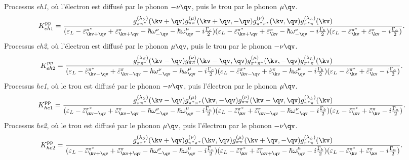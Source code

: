 Processus \textit{eh1}, où l'électron est diffusé par le phonon $-\nu\qv$, puis le trou par le phonon $\mu\qv$.
\begin{equation}
        K_{eh1}^{\text{pp}} = \frac{g^{(\lambda_S)}_{\pi\pi^*}(\kv+\qv)g^{(\mu)}_{\pi\pi}(\kv+\qv,-\qv)g_{\pi^*\pi^*}^{(\nu)}(\kv,\qv)g_{\pi^*\pi}^{(\lambda_L)}(\kv)}{(\varepsilon_L-\tilde{\varepsilon}_{\kv+\qv}^{\pi^*}+\tilde{\varepsilon}_{\kv+\qv}^\pi-\hbar\omega_{-\qv}^\nu-\hbar\omega_\qv^\mu-i\frac{\Gamma_c}{2})(\varepsilon_L-\tilde{\varepsilon}_{\kv+\qv}^{\pi^*}+\tilde{\varepsilon}_{\kv}^\pi-\hbar\omega_{-\qv}^\nu-i\frac{\Gamma_b}{2})(\varepsilon_L-\tilde{\varepsilon}_\kv^{\pi^*}+\tilde{\varepsilon}_{\kv}^\pi-i\frac{\Gamma_a}{2})}\label{eqn:pp_eh1}.
\end{equation}
Processus \textit{eh2}, où l'électron est diffusé par le phonon $\mu\qv$, puis le trou par le phonon $-\nu\qv$.
\begin{equation}
        K_{eh2}^{\text{pp}} = \frac{g^{(\lambda_S)}_{\pi\pi^*}(\kv-\qv)g^{(\nu)}_{\pi\pi}(\kv-\qv,\qv)g_{\pi^*\pi^*}^{(\mu)}(\kv,-\qv)g_{\pi^*\pi}^{(\lambda_L)}(\kv)}{(\varepsilon_L-\tilde{\varepsilon}_{\kv-\qv}^{\pi^*}+\tilde{\varepsilon}_{\kv-\qv}^\pi-\hbar\omega_{-\qv}^\nu-\hbar\omega_\qv^\mu-i\frac{\Gamma_c}{2})(\varepsilon_L-\tilde{\varepsilon}_{\kv-\qv}^{\pi^*}+\tilde{\varepsilon}_{\kv}^\pi-\hbar\omega_{\qv}^\mu-i\frac{\Gamma_b}{2})(\varepsilon_L-\tilde{\varepsilon}_\kv^{\pi^*}+\tilde{\varepsilon}_{\kv}^\pi-i\frac{\Gamma_a}{2})}\label{eqn:pp_eh2}.
\end{equation}
Processus \textit{he1}, où le trou est diffusé par le phonon $-\nu\qv$, puis l'électron par le phonon $\mu\qv$.
\begin{equation}
        K_{he1}^{\text{pp}} = \frac{g^{(\lambda_S)}_{\pi\pi^*}(\kv-\qv)g^{(\mu)}_{\pi^*\pi^*}(\kv,-\qv)g_{\pi\pi}^{(\nu)}(\kv-\qv,\qv)g_{\pi^*\pi}^{(\lambda_L)}(\kv)}{(\varepsilon_L-\tilde{\varepsilon}_{\kv-\qv}^{\pi^*}+\tilde{\varepsilon}_{\kv-\qv}^\pi-\hbar\omega_{-\qv}^\nu-\hbar\omega_\qv^\mu-i\frac{\Gamma_c}{2})(\varepsilon_L-\tilde{\varepsilon}_{\kv}^{\pi^*}+\tilde{\varepsilon}_{\kv-\qv}^\pi-\hbar\omega_{-\qv}^\nu-i\frac{\Gamma_b}{2})(\varepsilon_L-\tilde{\varepsilon}_\kv^{\pi^*}+\tilde{\varepsilon}_{\kv}^\pi-i\frac{\Gamma_a}{2})}\label{eqn:pp_he1}.
\end{equation}
Processus \textit{he2}, où le trou est diffusé par le phonon $\mu\qv$, puis l'électron par le phonon $-\nu\qv$.
\begin{equation}
        K_{he2}^{\text{pp}} = \frac{g^{(\lambda_S)}_{\pi\pi^*}(\kv+\qv)g^{(\nu)}_{\pi^*\pi^*}(\kv,\qv)g_{\pi\pi}^{(\mu)}(\kv+\qv,-\qv)g_{\pi^*\pi}^{(\lambda_L)}(\kv)}{(\varepsilon_L-\tilde{\varepsilon}_{\kv+\qv}^{\pi^*}+\tilde{\varepsilon}_{\kv+\qv}^\pi-\hbar\omega_{-\qv}^\nu-\hbar\omega_\qv^\mu-i\frac{\Gamma_c}{2})(\varepsilon_L-\tilde{\varepsilon}_{\kv}^{\pi^*}+\tilde{\varepsilon}_{\kv+\qv}^\pi-\hbar\omega_{\qv}^\mu-i\frac{\Gamma_b}{2})(\varepsilon_L-\tilde{\varepsilon}_\kv^{\pi^*}+\tilde{\varepsilon}_{\kv}^\pi-i\frac{\Gamma_a}{2})}\label{eqn:pp_he2}.
\end{equation}

